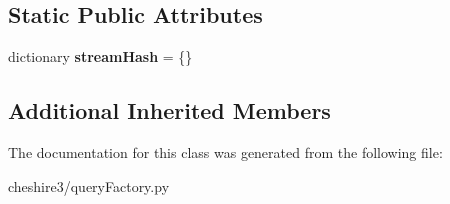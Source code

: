 \subsection*{Static Public Attributes}
\begin{DoxyCompactItemize}
\item 
\hypertarget{classcheshire3_1_1query_factory_1_1_simple_query_factory_a43e0fcf9bab5caf60f911b71a9fdd2ff}{dictionary {\bfseries stream\-Hash} = \{\}}\label{classcheshire3_1_1query_factory_1_1_simple_query_factory_a43e0fcf9bab5caf60f911b71a9fdd2ff}

\end{DoxyCompactItemize}
\subsection*{Additional Inherited Members}


The documentation for this class was generated from the following file\-:\begin{DoxyCompactItemize}
\item 
cheshire3/query\-Factory.\-py\end{DoxyCompactItemize}
